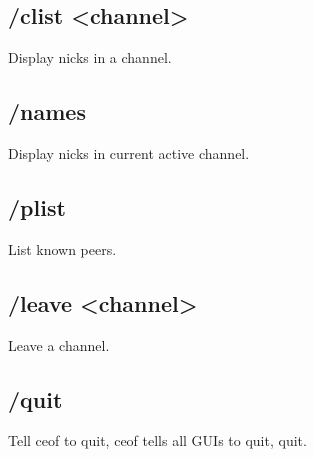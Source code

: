 \documentclass[12pt,a4paper]{article}
\begin{document}
\subsection{/clist <channel>}
Display nicks in a channel.

\subsection{/names}
Display nicks in current active channel.

\subsection{/plist}
List known peers.

\subsection{/leave <channel>}
Leave a channel.

\subsection{/quit}
Tell ceof to quit, ceof tells all GUIs to quit, quit.
\end{document}
